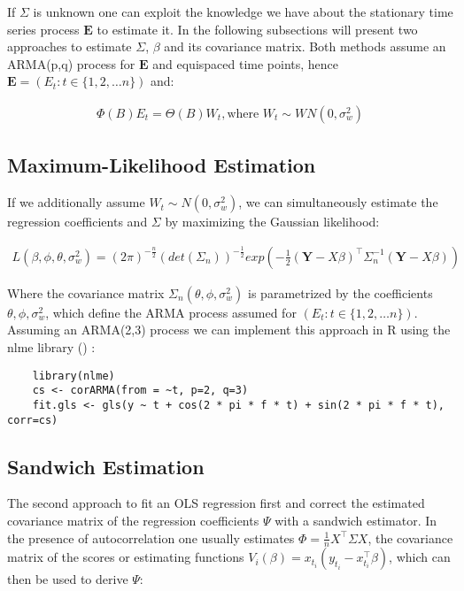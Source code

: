 If $\Sigma$ is unknown one can exploit the knowledge we have about the stationary time series process $\mathbf{E}$ to estimate it.
In the following subsections will present two approaches to estimate $\Sigma$, $\beta $ and its covariance matrix.
Both methods assume an ARMA(p,q) process for $\mathbf{E}$ and equispaced time points,
hence $\mathbf{E} = (E_t: t \in \{1, 2, \dots  n \})$ and:

\begin{gather*}
    \Phi(B)E_t = \Theta(B)W_t, \text{where $W_t \sim WN(0, \sigma_w^2)$}
\end{gather*}


\subsection{Maximum-Likelihood Estimation}\label{subsec:maximum-likelihood-estimation}

If we additionally assume $W_t \sim N(0, \sigma_w^2)$, we can simultaneously estimate the regression coefficients and $\Sigma$ by
maximizing the Gaussian likelihood:

\begin{gather*}
    L(\beta, \phi, \theta, \sigma_w^2) = (2 \pi)^{-\frac{n}{2}} (det(\Sigma_n))^{-\frac{1}{2}} exp(-\frac{1}{2}
    (\mathbf{Y}-X\beta)^{\top} \Sigma_n^{-1}(\mathbf{Y}-X\beta))
\end{gather*}

Where the covariance matrix $\Sigma_n(\theta, \phi, \sigma_w^2)$ is parametrized by the coefficients $\theta, \phi, \sigma_w^2$, which
define the ARMA process assumed for $(E_t: t \in \{1, 2, \dots  n \})$.
Assuming an ARMA(2,3) process we can implement this approach in R using the nlme library (\citeauthor{box_time_1994})
:
\begin{verbatim}
    library(nlme)
    cs <- corARMA(from = ~t, p=2, q=3)
    fit.gls <- gls(y ~ t + cos(2 * pi * f * t) + sin(2 * pi * f * t), corr=cs)
\end{verbatim}


\subsection{Sandwich Estimation}
The second approach to fit an OLS regression first and correct the estimated covariance matrix of the regression coefficients $\Psi$ with a
sandwich estimator.
In the presence of autocorrelation one usually estimates $\Phi = \frac{1}{n} X^{\top} \Sigma X$,
the covariance matrix of the scores or estimating functions
$V_i(\beta) = x_{t_i}(y_{t_i} - x_{t_i}^{\top}\beta)$, which can then be used to derive $\Psi$:

